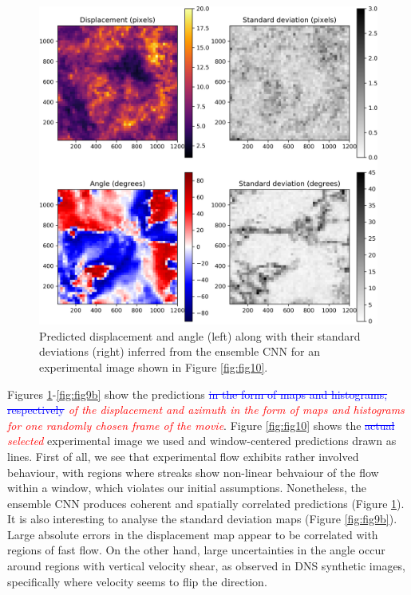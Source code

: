 \documentclass{svjour3}                     %
\newcommand{\new}[1]{\textit{\textcolor{red}{#1}}}
\newcommand{\old}[1]{\textcolor{blue}{\sout{#1}}}
\begin{document}
\begin{figure}
\includegraphics[width=\textwidth]{figs/figure8a.png}
\caption{Predicted displacement and angle (left) along with their standard deviations (right) inferred from the ensemble CNN for an experimental image shown in Figure \ref{fig:fig10}.}
\label{fig:fig9a}
\end{figure}

Figures \ref{fig:fig9a}-\ref{fig:fig9b} show the predictions \old{in the form of maps and histograms, respectively}\new{ of the displacement and azimuth in the form of maps and histograms for one randomly chosen frame of the movie}. Figure \ref{fig:fig10} shows the \old{actual} \new{selected} experimental image we used and window-centered predictions drawn as lines. First of all, we see that experimental flow exhibits rather involved behaviour, with regions where streaks show non-linear behvaiour of the flow within a window, which violates our initial assumptions. Nonetheless, the ensemble CNN produces coherent and spatially correlated predictions (Figure \ref{fig:fig9a}). It is also interesting to analyse the standard deviation maps (Figure \ref{fig:fig9b}). Large absolute errors in the displacement map appear to be correlated with regions of fast flow. On the other hand, large uncertainties in the angle occur around regions with vertical velocity shear, as observed in DNS synthetic images, specifically where velocity seems to flip the direction.
\end{document}
